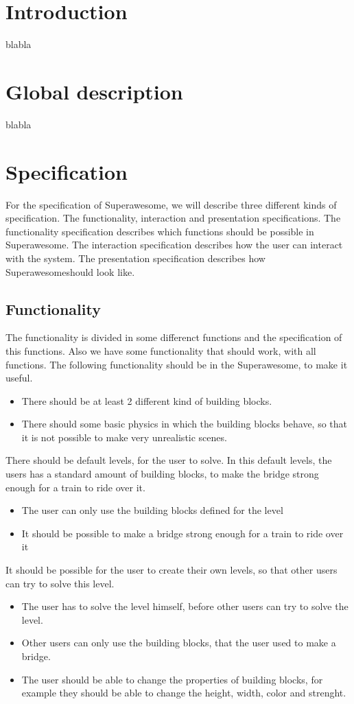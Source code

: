 \documentclass[10pt]{article}
\newcommand{\name}{Superawesome}
\begin{document}
\section{Introduction}
blabla
\section{Global description}
blabla
\section{Specification}
For the specification of \name, we will describe three different kinds of specification. The functionality, interaction and presentation specifications. The functionality specification describes which functions should be possible in \name. The interaction specification describes how the user can interact with the system. The presentation specification describes how \name should look like. 
 \subsection{Functionality}
 The functionality is divided in some differenct functions and the specification of this functions. Also we have some functionality that should work, with all functions.
 The following functionality should be in the \name, to make it useful.
  \begin{itemize}
  \item There should be at least 2 different kind of building blocks. 
  \item There should some basic physics in which the building blocks behave, so that it is not possible to make very unrealistic scenes.
  \end{itemize}
  There should be default levels, for the user to solve. In this default levels, the users has a standard amount of building blocks, to make the bridge strong enough for a train to ride over it. 
 \begin{itemize}
 \item The user can only use the building blocks defined for the level
 \item It should be possible to make a bridge strong enough for a train to ride over it
 \end{itemize}
  It should be possible for the user to create their own levels, so that other users can try to solve this level. 
 \begin{itemize}
 \item The user has to solve the level himself, before other users can try to solve the level.
 \item Other users can only use the building blocks, that the user used to make a bridge.
 \item The user should be able to change the properties of building blocks, for example they should be able to change the height, width, color and strenght.
 \end{itemize}
\end{document}
